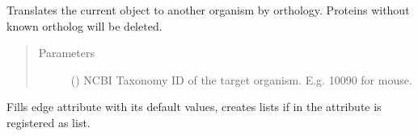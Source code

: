 \documentclass[letterpaper,10pt,english]{sphinxmanual}
\begin{document}
\begin{fulllineitems}
\begin{fulllineitems}
\end{fulllineitems}


\begin{fulllineitems}
\label{\detokenize{main:pypath.main.PyPath.homology_translation}}
Translates the current object to another organism by orthology.
Proteins without known ortholog will be deleted.
\begin{quote}\begin{description}
\item[{Parameters}] \leavevmode
{} () \textendash{} NCBI Taxonomy ID of the target organism.
E.g. 10090 for mouse.

\end{description}\end{quote}

\end{fulllineitems}


\begin{fulllineitems}
\label{\detokenize{main:pypath.main.PyPath.init_edge_attr}}
Fills edge attribute with its default values, creates
lists if in  the attribute is registered as list.

\end{fulllineitems}



\end{fulllineitems}
\end{document}
